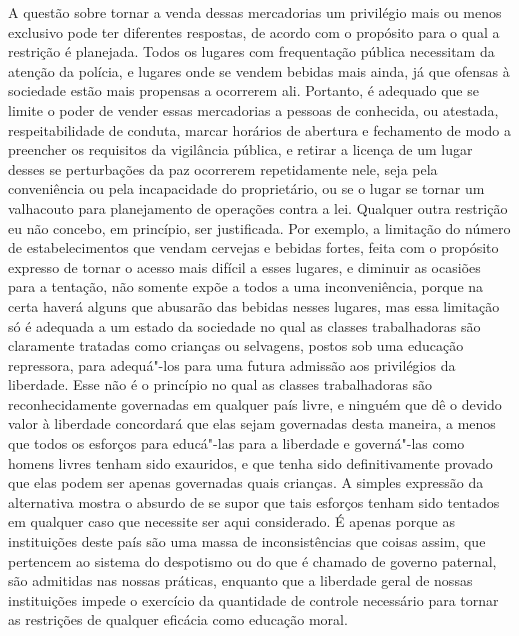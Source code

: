 A questão sobre tornar a venda dessas mercadorias um privilégio mais ou
menos exclusivo pode ter diferentes respostas, de acordo com o
propósito para o qual a restrição é planejada. Todos os lugares com
frequentação pública necessitam da atenção da polícia, e lugares
onde se vendem bebidas mais ainda, já que ofensas à sociedade estão
mais propensas a ocorrerem ali. Portanto, é adequado que se limite o
poder de vender essas mercadorias a pessoas de conhecida, ou atestada,
respeitabilidade de conduta, marcar horários de abertura e fechamento
de modo a preencher os requisitos da vigilância pública, e retirar
a licença de um lugar desses se perturbações da paz ocorrerem repetidamente
nele, seja pela conveniência ou pela incapacidade do proprietário, ou
se o lugar se tornar um valhacouto para planejamento de operações
contra a lei. Qualquer outra restrição eu não concebo, em princípio,
ser justificada. Por exemplo, a limitação do número de estabelecimentos
que vendam cervejas e bebidas fortes, feita com o propósito expresso de
tornar o acesso mais difícil a esses lugares, e diminuir as ocasiões
para a tentação, não somente expõe a todos a uma inconveniência, porque
na certa haverá alguns que abusarão das bebidas nesses lugares, mas
essa limitação só é adequada a um estado da sociedade no qual as
classes trabalhadoras são claramente tratadas como crianças ou
selvagens, postos sob uma educação repressora, para adequá"-los para
uma futura admissão aos privilégios da liberdade. Esse não é o
princípio no qual as classes trabalhadoras são reconhecidamente
governadas em qualquer país livre, e ninguém que dê o devido valor à
liberdade concordará que elas sejam governadas desta maneira, a menos
que todos os esforços para educá"-las para a liberdade e governá"-las
como homens livres tenham sido exauridos, e que tenha sido
definitivamente provado que elas podem ser apenas governadas quais
crianças. A simples expressão da alternativa mostra o absurdo de se
supor que tais esforços tenham sido tentados em qualquer caso que
necessite ser aqui considerado. É apenas porque as instituições deste
país são uma massa de inconsistências que coisas assim, que pertencem
ao sistema do despotismo ou do que é chamado de governo paternal, são
admitidas nas nossas práticas, enquanto que a liberdade geral de nossas
instituições impede o exercício da quantidade de controle necessário
para tornar as restrições de qualquer eficácia como educação moral.

